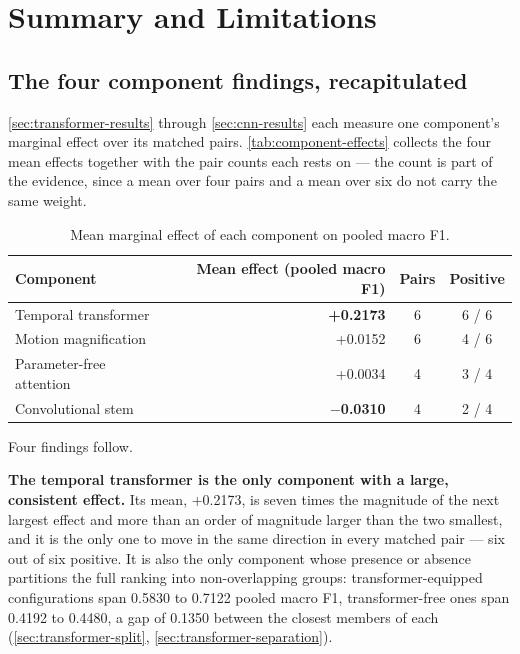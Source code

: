 \section{Summary and Limitations}
\label{sec:summary-limitations}

\subsection{The four component findings, recapitulated}
\label{sec:four-findings}

\autoref{sec:transformer-results} through \autoref{sec:cnn-results} each measure one component's marginal effect over its matched pairs. \autoref{tab:component-effects} collects the four mean effects together with the pair counts each rests on --- the count is part of the evidence, since a mean over four pairs and a mean over six do not carry the same weight.

\begin{table}[htbp]
	\centering
	\begin{tabular}{l r c c}
		\hline
		\textbf{Component} & \textbf{Mean effect (pooled macro F1)} & \textbf{Pairs} & \textbf{Positive} \\
		\hline
		Temporal transformer      & \textbf{+0.2173} & 6 & 6 / 6 \\
		Motion magnification      & +0.0152          & 6 & 4 / 6 \\
		Parameter-free attention  & +0.0034          & 4 & 3 / 4 \\
		Convolutional stem        & \textbf{$-$0.0310} & 4 & 2 / 4 \\
		\hline
	\end{tabular}
	\caption[Mean marginal effect of each component on pooled macro F1]{Mean marginal effect of each component on pooled macro F1.}
	\label{tab:component-effects}
\end{table}

Four findings follow.

\textbf{The temporal transformer is the only component with a large, consistent effect.} Its mean, +0.2173, is seven times the magnitude of the next largest effect and more than an order of magnitude larger than the two smallest, and it is the only one to move in the same direction in every matched pair --- six out of six positive. It is also the only component whose presence or absence partitions the full ranking into non-overlapping groups: transformer-equipped configurations span 0.5830 to 0.7122 pooled macro F1, transformer-free ones span 0.4192 to 0.4480, a gap of 0.1350 between the closest members of each (\autoref{sec:transformer-split}, \autoref{sec:transformer-separation}).

